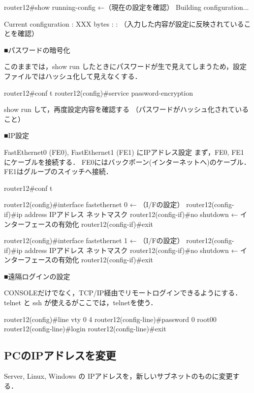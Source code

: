 \begin{cli}
router12#show running-config                                 ←（現在の設定を確認）
Building configuration...

Current configuration : XXX bytes
        :
        :
（入力した内容が設定に反映されていることを確認）

■パスワードの暗号化

このままでは，show run したときにパスワードが生で見えてしまうため，設定ファイルではハッシュ化して見えなくする．

router12#conf t
router12(config)#service password-encryption

show run して，再度設定内容を確認する
（パスワードがハッシュ化されていること）

■IP設定

FastEthernet0 (FE0), FastEthernet1 (FE1) にIPアドレス設定
まず，FE0, FE1 にケーブルを接続する．
FE0にはバックボーン(インターネットへ)のケーブル．
FE1はグループのスイッチへ接続．

router12#conf t

router12(config)#interface fastethernet 0                ← （I/Fの設定）
router12(config-if)#ip address IPアドレス  ネットマスク
router12(config-if)#no shutdown      ← インターフェースの有効化
router12(config-if)#exit

router12(config)#interface fastethernet 1                ← （I/Fの設定）
router12(config-if)#ip address IPアドレス  ネットマスク
router12(config-if)#no shutdown      ← インターフェースの有効化
router12(config-if)#exit

■遠隔ログインの設定

CONSOLEだけでなく，TCP/IP経由でリモートログインできるようにする．telnet と ssh が使えるがここでは，telnetを使う．

router12(config)#line vty 0 4
router12(config-line)#password 0 root00
router12(config-line)#login
router12(config-line)#exit


\end{cli}

\subsection{PCのIPアドレスを変更}

Server, Linux, Windows の IPアドレスを，新しいサブネットのものに変更する．

